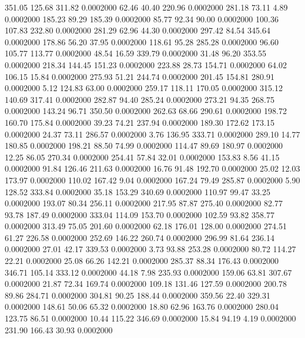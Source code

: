  351.05  125.68  311.82   0.0002000
  62.46   40.40  220.96   0.0002000
 281.18   73.11    4.89   0.0002000
 185.23   89.29  185.39   0.0002000
  85.77   92.34   90.00   0.0002000
 100.36  107.83  232.80   0.0002000
 281.29   62.96   44.30   0.0002000
 297.42   84.54  345.64   0.0002000
 178.86   56.20   37.95   0.0002000
 118.61   95.28  285.28   0.0002000
  96.60  105.77  113.77   0.0002000
  48.54   16.59  339.79   0.0002000
  31.48   96.20  353.55   0.0002000
 218.34  144.45  151.23   0.0002000
 223.88   28.73  154.71   0.0002000
  64.02  106.15   15.84   0.0002000
 275.93   51.21  244.74   0.0002000
 201.45  154.81  280.91   0.0002000
   5.12  124.83   63.00   0.0002000
 259.17  118.11  170.05   0.0002000
 315.12  140.69  317.41   0.0002000
 282.87   94.40  285.24   0.0002000
 273.21   94.35  268.75   0.0002000
 143.24   96.71  350.50   0.0002000
 262.63   68.66  290.61   0.0002000
 198.72  160.70  175.84   0.0002000
  39.23   74.21  237.94   0.0002000
 189.30  172.62  173.15   0.0002000
  24.37   73.11  286.57   0.0002000
   3.76  136.95  333.71   0.0002000
 289.10   14.77  180.85   0.0002000
 198.21   88.50   74.99   0.0002000
 114.47   89.69  180.97   0.0002000
  12.25   86.05  270.34   0.0002000
 254.41   57.84   32.01   0.0002000
 153.83    8.56   41.15   0.0002000
  91.84  126.46  211.63   0.0002000
  16.76   91.48  192.70   0.0002000
  25.02   12.03  173.97   0.0002000
 110.02  167.42    9.04   0.0002000
 167.24   79.49  285.87   0.0002000
   5.90  128.52  333.84   0.0002000
  35.18  153.29  340.69   0.0002000
 110.97   99.47   33.25   0.0002000
 193.07   80.34  256.11   0.0002000
 217.95   87.87  275.40   0.0002000
  82.77   93.78  187.49   0.0002000
 333.04  114.09  153.70   0.0002000
 102.59   93.82  358.77   0.0002000
 313.49   75.05  201.60   0.0002000
  62.18  176.01  128.00   0.0002000
 274.51   61.27  226.58   0.0002000
 252.69  146.22  260.74   0.0002000
 296.99   81.64  236.14   0.0002000
  27.01   42.17  339.53   0.0002000
   3.73   93.88  253.28   0.0002000
  80.72  114.27   22.21   0.0002000
  25.08   66.26  142.21   0.0002000
 285.37   88.34  176.43   0.0002000
 346.71  105.14  333.12   0.0002000
  44.18    7.98  235.93   0.0002000
 159.06   63.81  307.67   0.0002000
  21.87   72.34  169.74   0.0002000
 109.18  131.46  127.59   0.0002000
 200.78   89.86  284.71   0.0002000
 304.81   90.25  188.44   0.0002000
 359.56   22.40  329.31   0.0002000
 148.61   50.06   65.32   0.0002000
  18.80   62.96  163.76   0.0002000
 280.04  123.75   86.51   0.0002000
  10.44  115.22  346.69   0.0002000
  15.84   94.19    4.19   0.0002000
 231.90  166.43   30.93   0.0002000
